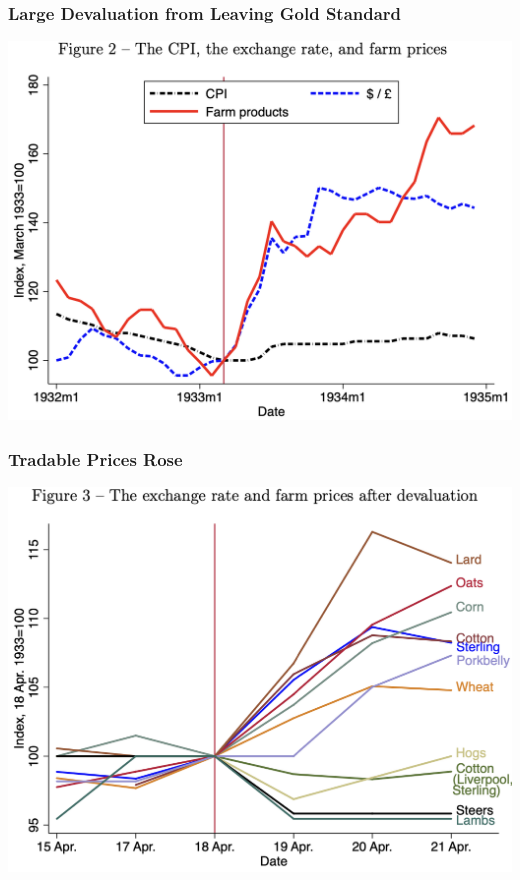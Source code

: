 \documentclass[english,xcolor=svgnames]{beamer}
\begin{document}
\begin{frame}
\frametitle[alignment=center]{Large Devaluation from Leaving Gold Standard}
\centering
\includegraphics[scale=0.5]{figures/HRWFIG2.png}
\end{frame}

\begin{frame}
\frametitle[alignment=center]{Tradable Prices Rose}
\centering
\includegraphics[scale=0.5]{figures/HRWFIG3.png}
\end{frame}
\end{document}
